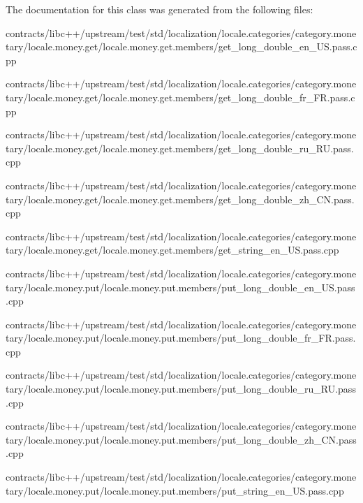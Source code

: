 The documentation for this class was generated from the following files\+:\begin{DoxyCompactItemize}
\item 
contracts/libc++/upstream/test/std/localization/locale.\+categories/category.\+monetary/locale.\+money.\+get/locale.\+money.\+get.\+members/get\+\_\+long\+\_\+double\+\_\+en\+\_\+\+U\+S.\+pass.\+cpp\item 
contracts/libc++/upstream/test/std/localization/locale.\+categories/category.\+monetary/locale.\+money.\+get/locale.\+money.\+get.\+members/get\+\_\+long\+\_\+double\+\_\+fr\+\_\+\+F\+R.\+pass.\+cpp\item 
contracts/libc++/upstream/test/std/localization/locale.\+categories/category.\+monetary/locale.\+money.\+get/locale.\+money.\+get.\+members/get\+\_\+long\+\_\+double\+\_\+ru\+\_\+\+R\+U.\+pass.\+cpp\item 
contracts/libc++/upstream/test/std/localization/locale.\+categories/category.\+monetary/locale.\+money.\+get/locale.\+money.\+get.\+members/get\+\_\+long\+\_\+double\+\_\+zh\+\_\+\+C\+N.\+pass.\+cpp\item 
contracts/libc++/upstream/test/std/localization/locale.\+categories/category.\+monetary/locale.\+money.\+get/locale.\+money.\+get.\+members/get\+\_\+string\+\_\+en\+\_\+\+U\+S.\+pass.\+cpp\item 
contracts/libc++/upstream/test/std/localization/locale.\+categories/category.\+monetary/locale.\+money.\+put/locale.\+money.\+put.\+members/put\+\_\+long\+\_\+double\+\_\+en\+\_\+\+U\+S.\+pass.\+cpp\item 
contracts/libc++/upstream/test/std/localization/locale.\+categories/category.\+monetary/locale.\+money.\+put/locale.\+money.\+put.\+members/put\+\_\+long\+\_\+double\+\_\+fr\+\_\+\+F\+R.\+pass.\+cpp\item 
contracts/libc++/upstream/test/std/localization/locale.\+categories/category.\+monetary/locale.\+money.\+put/locale.\+money.\+put.\+members/put\+\_\+long\+\_\+double\+\_\+ru\+\_\+\+R\+U.\+pass.\+cpp\item 
contracts/libc++/upstream/test/std/localization/locale.\+categories/category.\+monetary/locale.\+money.\+put/locale.\+money.\+put.\+members/put\+\_\+long\+\_\+double\+\_\+zh\+\_\+\+C\+N.\+pass.\+cpp\item 
contracts/libc++/upstream/test/std/localization/locale.\+categories/category.\+monetary/locale.\+money.\+put/locale.\+money.\+put.\+members/put\+\_\+string\+\_\+en\+\_\+\+U\+S.\+pass.\+cpp\end{DoxyCompactItemize}
